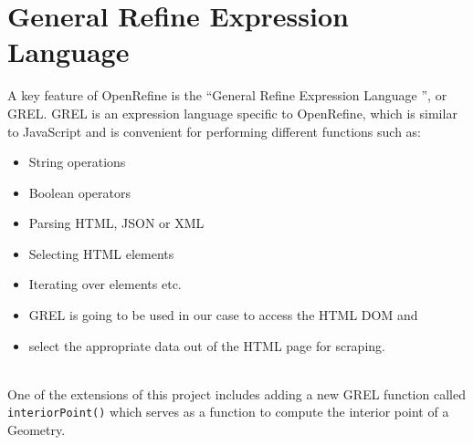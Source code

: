 \section{General Refine Expression Language}
A key feature of OpenRefine is the \textquotedblleft General Refine Expression Language \textquotedblright, or GREL.
GREL is an expression language specific to OpenRefine, which is similar to JavaScript and is convenient for performing different functions such as:
\begin{itemize}
    \item String operations
    \item Boolean operators
    \item Parsing HTML, JSON or XML
    \item Selecting HTML elements
    \item Iterating over elements etc.
    \item GREL is going to be used in our case to access the HTML DOM and
    \item select the appropriate data out of the HTML page for scraping.
\end{itemize} \cite{OpenRefineCoreDump}\\
\newline
One of the extensions of this project includes adding a new GREL function called \texttt{interiorPoint()}
which serves as a function to compute the interior point of a Geometry.